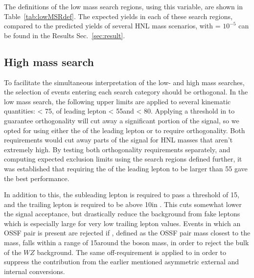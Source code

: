 The definitions of the low mass
search regions, using this variable, are shown in
Table~\ref{tab:lowMSRdef}. The expected yields in each of these search
regions, compared to the predicted yields of several HNL mass
scenarios, with \mixpar = $10^{-5}$ can be found in the Results Sec.~\ref{sec:result}.  

\begin{table}[tbh]
\centering
\caption{Search regions in the low mass category.}
\label{tab:lowMSRdef}
\end{table}



\subsection{High mass search}
To facilitate the simultaneous interpretation of the low- and high mass searches, the selection of events entering each search category should be orthogonal. In the low mass search, the following upper limits are applied to several kinematic quantities: 
\ptmiss < 75\GeV, \pt of leading lepton < 55\GeV and \mlll<
80\GeV. Applying a threshold in \met to guarantee orthogonality will
cut away a significant portion of the signal, so we opted for using
either the \pt of the leading lepton or \mlll to require
orthogonality. Both requirements would cut away parts of the signal
for HNL masses that aren't extremely high. By testing both
orthogonality requirements separately, and computing expected
exclusion limits using the search regions defined further,
 it was established that requiring the \pt of the leading lepton to be
 larger than 55 \GeV gave the best performance.
 
In addition to this, the subleading lepton is
 required to pass a \pt threshold of 15\GeV, and the trailing lepton
 is required to be above 10\GeV in \pt .
 This cuts somewhat lower the signal acceptance, but drastically
 reduce the background from fake leptons which is especially large for
 very low trailing lepton \pt values. Events in which an OSSF pair is
 present are rejected if \Mll, defined as the OSSF pair mass closest
 to the \PZ mass, falls within a range of 15\GeV around the \PZ boson
 mass, in order to reject the bulk of the $WZ$ background.
 The same off-\PZ requirement is applied to \mlll in order to suppress
 the contribution from the earlier mentioned asymmetric external and
 internal conversions.

